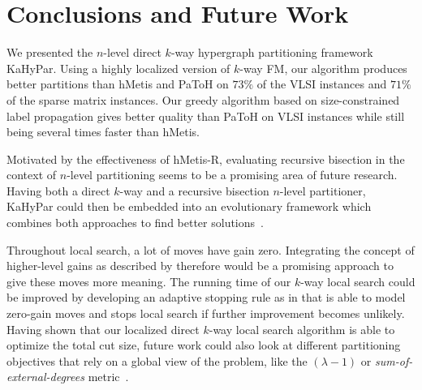 \documentclass[runningheads,a4paper]{llncs}
\begin{document}
\section{Conclusions and Future Work}  \label{Conclusions}
We presented the $n$-level direct $k$-way hypergraph partitioning framework KaHyPar.
Using a highly localized version of $k$-way FM, our algorithm produces better partitions
than hMetis and PaToH on $73\%$ of the VLSI instances and $71\%$ of the sparse matrix instances. 
Our greedy algorithm based on size-constrained label propagation gives better quality than PaToH on VLSI instances 
while still being several times faster than hMetis.

Motivated by the effectiveness of hMetis-R, evaluating recursive bisection in the context of $n$-level partitioning
seems to be a promising area of future research. Having both a direct $k$-way and a recursive bisection $n$-level 
partitioner, KaHyPar could then be embedded into an evolutionary framework which combines both approaches to find better solutions~\cite{SandersS12distributed}.

Throughout local search, a lot of moves have gain zero.
Integrating the concept of higher-level gains as described by
\cite{LockedNets,HypergraphKFM} therefore would be a promising approach to give these moves more
meaning. 
The running time of our $k$-way local search could be improved by developing an adaptive
stopping rule as in \cite{nGP} that is able to model zero-gain moves and stops local search if further improvement becomes unlikely.
Having shown that our localized direct $k$-way local search algorithm is able to optimize the total cut size, future work
could also look at different partitioning objectives that rely on a global view of the problem, like the $(\lambda-1)$ or \emph{sum-of-external-degrees}
metric~\cite{hMetisKway}.

{


}

\appendix
\newpage
\end{document}
